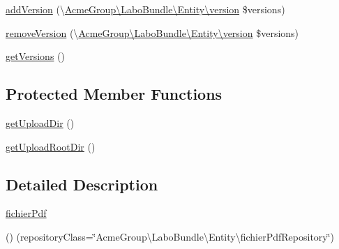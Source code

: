 \begin{DoxyCompactItemize}
\item 
\hyperlink{class_acme_group_1_1_labo_bundle_1_1_entity_1_1fichier_pdf_a1bf6f8cee72dbc696a783c498395879f}{add\+Version} (\textbackslash{}\hyperlink{class_acme_group_1_1_labo_bundle_1_1_entity_1_1version}{Acme\+Group\textbackslash{}\+Labo\+Bundle\textbackslash{}\+Entity\textbackslash{}version} \$versions)
\item 
\hyperlink{class_acme_group_1_1_labo_bundle_1_1_entity_1_1fichier_pdf_acb4348ce1d3f09a301680659c4366b84}{remove\+Version} (\textbackslash{}\hyperlink{class_acme_group_1_1_labo_bundle_1_1_entity_1_1version}{Acme\+Group\textbackslash{}\+Labo\+Bundle\textbackslash{}\+Entity\textbackslash{}version} \$versions)
\item 
\hyperlink{class_acme_group_1_1_labo_bundle_1_1_entity_1_1fichier_pdf_adbca2d6be0d82762515d6b19ffd44c7e}{get\+Versions} ()
\end{DoxyCompactItemize}
\subsection*{Protected Member Functions}
\begin{DoxyCompactItemize}
\item 
\hyperlink{class_acme_group_1_1_labo_bundle_1_1_entity_1_1fichier_pdf_a7adeee65bd019b652100aa93ed5672f6}{get\+Upload\+Dir} ()
\item 
\hyperlink{class_acme_group_1_1_labo_bundle_1_1_entity_1_1fichier_pdf_a260e26f7619a699903dc8b3a97618221}{get\+Upload\+Root\+Dir} ()
\end{DoxyCompactItemize}


\subsection{Detailed Description}
\hyperlink{class_acme_group_1_1_labo_bundle_1_1_entity_1_1fichier_pdf}{fichier\+Pdf}

() (repository\+Class=\char`\"{}\+Acme\+Group\textbackslash{}\+Labo\+Bundle\textbackslash{}\+Entity\textbackslash{}fichier\+Pdf\+Repository\char`\"{})  

